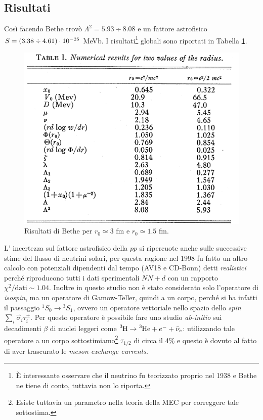 \subsection{Risultati}
Così facendo Bethe trovò $\Lambda^2 = 5.93 \div 8.08 $ e un fattore astrofisico $S = ( 3.38 \div 4.61 )\cdot10^{-25}$ MeVb. I risultati\footnote{È interessante osservare che il neutrino fu teorizzato proprio nel 1938 e Bethe ne tiene di conto, tuttavia non lo riporta.} globali sono riportati in Tabella \ref{0331_tab}.
\begin{figure}[h]
    \centering
    \includegraphics*[scale=0.5]{Immagini/0331_Bethetab.png}
    \caption{Risultati di Bethe per $r_0 \simeq  3$ fm e $r_0 \simeq 1.5$ fm.}
    \label{0331_tab}
\end{figure}
\newline
\noindent L' incertezza sul fattore astrofisico della $pp$ si ripercuote anche sulle successive stime del flusso di neutrini solari, per questa ragione nel 1998 fu fatto un altro calcolo con potenziali dipendenti dal tempo (AV18 e CD-Bonn) detti \textit{realistici} perché riproducono tutti i dati sperimentali $NN + d$ con un rapporto $\chi^2/\text{dati}\sim 1.04$.
Inoltre in questo studio non è stato considerato solo l'operatore di \textit{isospin}, ma un operatore di Gamow-Teller, quindi a un corpo, perché si ha infatti il passaggio ${^1S_0} \to {^3S_1}$, ovvero un operatore vettoriale nello spazio dello \textit{spin} $\sum_i \vec{\sigma}_i \tau^\pm_i$. Per questo operatore è possibile fare uno studio \textit{ab-initio} sui decadimenti $\beta$ di nuclei leggeri come $\ce{^3H}\to\ce{^3He} +e^- + \bar{\nu}_e$: utilizzando tale operatore a un corpo sottostimiamo\footnote{Esiste tuttavia un parametro nella teoria della MEC per correggere tale sottostima.} $\tau_{1/2}$ di circa il 4\% e questo è dovuto al fatto di aver trascurato le \textit{meson-exchange currents}.
